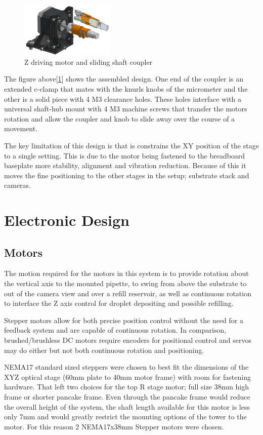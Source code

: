 \begin{figure}[h]
    \centering
    \includegraphics[width=0.4\textwidth]{img/z_control.png}
    \caption{Z driving motor and sliding shaft coupler}
    \label{fig:z_coup}
\end{figure}

The figure above[\ref{fig:z_coup}] shows the assembled design. One end of the coupler is an extended c-clamp that mates with the knurls knobs of the micrometer and the other is a solid piece with 4 M3 clearance holes. These holes interface with a universal shaft-hub mount with 4 M3 machine screws that transfer the motors rotation and allow the coupler and knob to slide away over the course of a movement.

The key limitation of this design is that is constrains the XY position of the stage to a single setting. This is due to the motor being fastened to the breadboard baseplate more stability, alignment and vibration reduction. Because of this it moves the fine positioning to the other stages in the setup; substrate stack and cameras. 

\section{Electronic Design}

\subsection{Motors}
The motion required for the motors in this system is to provide rotation about the vertical axis to the mounted pipette, to swing from above the substrate to out of the camera view and over a refill reservoir, as well as continuous rotation to interface the Z axis control for droplet depositing and possible refilling.

Stepper motors allow for both precise position control without the need for a feedback system and are capable of continuous rotation. In comparison, brushed/brushless DC motors require encoders for positional control and servos may do either but not both continuous rotation and positioning.

NEMA17 standard sized steppers were chosen to best fit the dimensions of the XYZ optical stage (60mm plate to 40mm motor frame) with room for fastening hardware. That left two choices for the top R stage motor; full size 38mm high frame or shorter pancake frame. Even through the pancake frame would reduce the overall height of the system, the shaft length available for this motor is less only 7mm and would greatly restrict the mounting options of the tower to the motor. For this reason 2 NEMA17x38mm Stepper motors were chosen.

